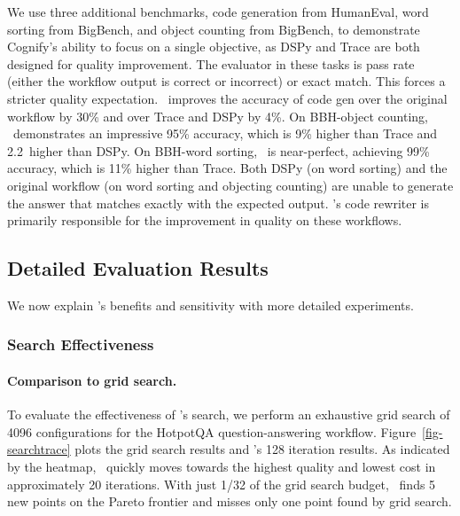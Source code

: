 We use three additional benchmarks, code generation from HumanEval, word sorting from BigBench, and object counting from BigBench, to demonstrate Cognify's ability to focus on a single objective, as DSPy and Trace are both designed for quality improvement. The evaluator in these tasks is pass rate (either the workflow output is correct or incorrect) or exact match. This forces a stricter quality expectation. \sysname\ improves the accuracy of code gen over the original workflow by 30\% and over Trace and DSPy by 4\%. %
On BBH-object counting, \sysname\ demonstrates an impressive 95\% accuracy, which is 9\% higher than Trace and 2.2\x{}\ higher than DSPy. On BBH-word sorting, \sysname\ is near-perfect, achieving 99\% accuracy, which is 11\% higher than Trace. Both DSPy (on word sorting) and the original workflow (on word sorting and objecting counting) are unable to generate the answer that matches exactly with the expected output. \sysname's code rewriter is primarily responsible for the improvement in quality on these workflows.

\subsection{Detailed Evaluation Results}

We now explain \sysname's benefits and sensitivity with more detailed experiments.

\subsubsection{Search Effectiveness}



\paragraph{Comparison to grid search.}
To evaluate the effectiveness of \sysname's search, we perform an exhaustive grid search of 4096 configurations for the HotpotQA question-answering workflow.
Figure~\ref{fig-searchtrace} plots the grid search results and \sysname's 128 iteration results. As indicated by the heatmap, \sysname\ quickly moves towards the highest quality and lowest cost in approximately 20 iterations. With just 1/32 of the grid search budget, \sysname\ finds 5 new points on the Pareto frontier and misses only one point found by grid search. 

